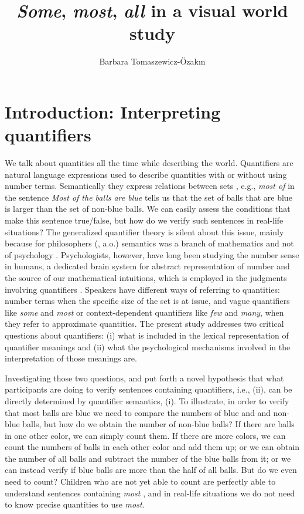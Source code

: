 \documentclass[output=paper]{langscibook}
\author{Barbara Tomaszewicz-Özakın\affiliation{University of Cologne}}
\title{\textit{Some}, \textit{most}, \textit{all} in a visual world study}
\begin{document}
\maketitle

\section{Introduction: Interpreting quantifiers} 

We talk about quantities all the time while describing the world. Quantifiers are natural language expressions used to
describe quantities with or without using number terms. Semantically they express relations between sets \citep{barwise1981generalized}, e.g., \textit{most of }in the sentence \textit{Most of the balls are blue} tells us that the set of
balls that are blue is larger than the set of non-blue balls. We can easily assess the conditions that make this
sentence true/false, but how do we verify such sentences in real-life situations? The generalized quantifier theory
\citep{mostowski1960generalization, perlindstrom1966first,montague1973proper} is silent about this issue, mainly because for philosophers (\citealt{montague1973proper}, a.o.) semantics was a branch of mathematics and not of psychology \citep{partee2011formal}. Psychologists, however, have long been
studying the number sense in humans, a dedicated brain system for abstract representation of number and the source of
our mathematical intuitions, which is employed in the judgments involving quantifiers \citep{feigenson2004core,mcmillan2005neural,mcmillan2006quantifier,clark2007number,dehaene2009origins,dehaene2011number,troiani2009logical}. Speakers have different ways of referring to quantities:
number terms when the specific size of the set is at issue, and vague quantifiers like \textit{some} and \textit{most}
or context-dependent quantifiers like \textit{few} and \textit{many}, when they refer to approximate quantities. The
present study addresses two critical questions about quantifiers: (i) what is included in the lexical representation of quantifier meanings
and (ii) what the psychological mechanisms involved in the interpretation of those meanings are.

Investigating those two questions, \citet{pietroski2009meaning} and \citet{lidz2011interface} put forth a novel hypothesis that what
participants are doing to verify sentences containing quantifiers, i.e., (ii), can be directly determined by quantifier
semantics, (i). To illustrate, in order to verify that most balls are blue we need to compare the numbers of
blue and and non-blue balls, but how do we obtain the number of non-blue balls? If there are balls in one other color,
we can simply count them. If there are more colors, we can count the numbers of balls in each other color and add them
up; or we can obtain the number of all balls and subtract the number of the blue balls from it; or we can instead
verify if blue balls are more than the half of all balls. But do we even need to count? Children who are not yet able
to count are perfectly able to understand sentences containing \textit{most} \citep{halberda2008development,odic2018individuals}, and in real-life situations we do not need to know precise quantities to use \textit{most}. 
\end{document}
